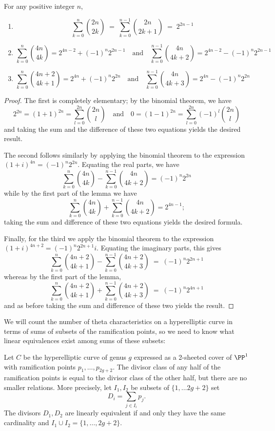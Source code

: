 \begin{lemma}\label{summing binomials}
For any positive integer $n$,
\begin{enumerate}
\item 
$$
\sum_{k=0}^n \binom{2n}{2k} \; = \; \sum_{k=0}^{n-1} \binom{2n}{2k+1} \; = \; 2^{2n-1}
$$
\item 
$$
\sum_{k=0}^n \binom{4n}{4k} = 2^{4n-2}  + (-1)^n 2^{2n-1} \quad \text{and} \quad \sum_{k=0}^{n-1} \binom{4n}{4k+2} = 2^{4n-2} - (-1)^n  2^{2n-1}
$$
\item 
$$
\sum_{k=0}^n \binom{4n+2}{4k+1} = 2^{4n} + (-1)^n 2^{2n} \quad \text{and} \quad \sum_{k=0}^{n-1} \binom{4n}{4k+3} = 2^{4n} - (-1)^n  2^{2n}
$$
\end{enumerate}
\end{lemma}

\begin{proof}
The first is completely elementary; by the binomial theorem, we have
$$
2^{2n} = (1+1)^{2n} = \sum_{l = 0}^{2n} \binom{2n}{l} \quad \text{and} \quad 0 = (1-1)^{2n} = \sum_{l = 0}^{2n} (-1)^l\binom{2n}{l}
$$
and taking the sum and the difference of these two equations yields the desired result.

The second  follows similarly by applying the binomial theorem to the expression $(1 + i)^{4n} = (-1)^n2^{2n}$. Equating the real parts, we have
$$
\sum_{k=0}^n \binom{4n}{4k} - \sum_{k=0}^{n-1} \binom{4n}{4k+2} = (-1)^n2^{2n}
$$
while by the first part of the lemma we have
$$
\sum_{k=0}^n \binom{4n}{4k} + \sum_{k=0}^{n-1} \binom{4n}{4k+2} = 2^{4n-1};
$$
taking the sum and difference of these two equations yields the desired formula.

Finally, for the third we apply the binomial theorem to the expression $(1 + i)^{4n+2} = (-1)^n2^{2n+1}i$. Equating the imaginary parts, this gives
$$
\sum_{k=0}^n \binom{4n+2}{4k+1} - \sum_{k=0}^{n-1} \binom{4n+2}{4k+3} \; = \; (-1)^n2^{2n+1}
$$
whereas by the first part of the lemma,
$$
\sum_{k=0}^n \binom{4n+2}{4k+1} + \sum_{k=0}^{n-1} \binom{4n+2}{4k+3} \; = \; (-1)^n 2^{4n+1}
$$
and as before taking the sum and difference of these two yields the result.
\end{proof}

We will count the number of theta characteristics on a hyperelliptic curve in terms of sums of subsets of the ramification points, so we need to know what linear equivalences exist among sums of these subsets:

\begin{lemma}\label{ramification point relations}
Let $C$ be the hyperelliptic curve of genus $g$ expressed as a 2-sheeted cover of $\PP^1$ with ramification points $p_1,\dots,p_{2g+2}$. The divisor class of
 any half of the ramification points is equal to the divisor class of the other half, but there are no
 smaller relations. More precisely,
 let $I_1,I_2$ be subsets of $\{1,\dots 2g+2\}$
set 
$$
D_i = \sum_{j\in I_i} p_j.
$$
The divisors $D_1,D_2$ are linearly equivalent if and only they
have the same cardinality and $I_1\cup I_2 = \{1,\dots, 2g+2\}$.\end{lemma}

